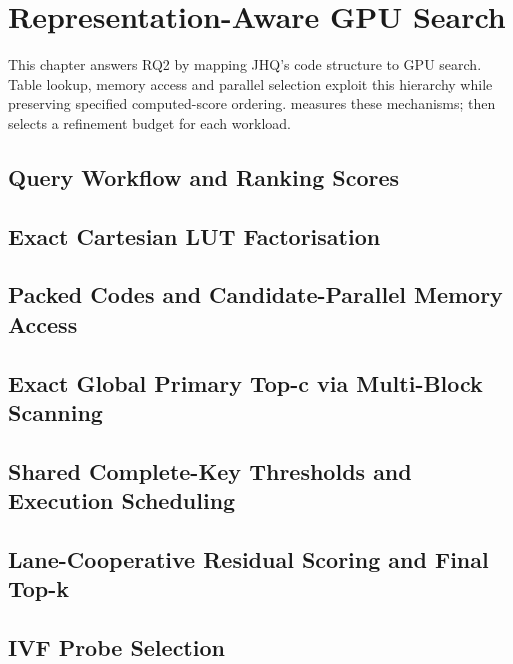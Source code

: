 \chapter{Representation-Aware GPU Search}
\label{ch:gpu-execution}
This chapter answers RQ2 by mapping JHQ's code structure to GPU search.
Table lookup, memory access and parallel selection exploit this hierarchy
\cite{jhq} while preserving specified computed-score ordering.  measures these
mechanisms;  then selects a refinement budget for each
workload.

\section{Query Workflow and Ranking Scores}
\label{sec:5-1}


\section{Exact Cartesian LUT Factorisation}
\label{sec:5-2}


\section{Packed Codes and Candidate-Parallel Memory Access}
\label{sec:5-3}


\section{Exact Global Primary Top-c via Multi-Block Scanning}
\label{sec:5-4}


\section{Shared Complete-Key Thresholds and Execution Scheduling}
\label{sec:5-5}


\section{Lane-Cooperative Residual Scoring and Final Top-k}
\label{sec:5-6}


\section{IVF Probe Selection}
\label{sec:5-7}

